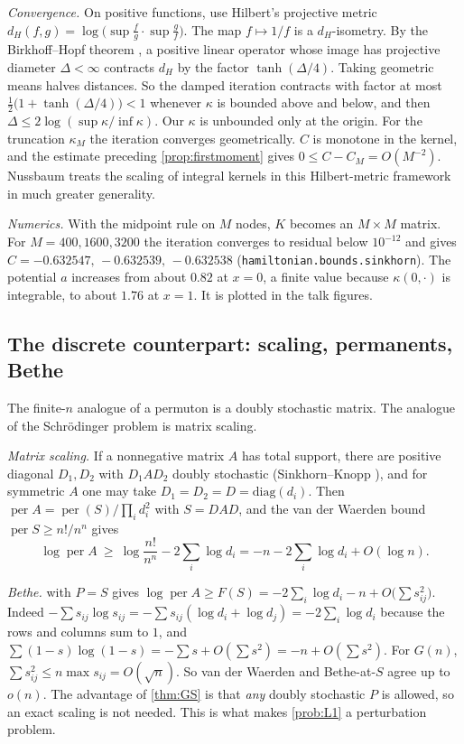 \emph{Convergence.} On positive functions, use Hilbert's projective metric
$d_H(f,g)=\log\bigl(\sup\frac fg\cdot\sup\frac gf\bigr)$. The map $f\mapsto1/f$ is a
$d_H$-isometry. By the Birkhoff--Hopf theorem \cite{Birkhoff}, a positive linear operator
whose image has projective diameter $\Delta<\infty$ contracts $d_H$ by the factor
$\tanh(\Delta/4)$. Taking geometric means halves distances. So the damped iteration
contracts with factor at most $\frac12\bigl(1+\tanh(\Delta/4)\bigr)<1$ whenever
$\kappa$ is bounded above and below, and then $\Delta\le2\log(\sup\kappa/\inf\kappa)$.
Our $\kappa$ is unbounded only at the origin. For the truncation $\kappa_M$ the iteration
converges geometrically. $C$ is monotone in the kernel, and the estimate preceding
\cref{prop:firstmoment} gives $0\le C-C_M=O(M^{-2})$. Nussbaum \cite{Nussbaum} treats
the scaling of integral kernels in this Hilbert-metric framework in much greater generality.

\emph{Numerics.} With the midpoint rule on $M$ nodes, $K$ becomes an $M\times M$ matrix.
For $M=400,1600,3200$ the iteration converges to residual below $10^{-12}$ and gives
$C=-0.632547,\,-0.632539,\,-0.632538$ (\texttt{hamiltonian.bounds.sinkhorn}). The potential
$a$ increases from about $0.82$ at $x=0$, a finite value because $\kappa(0,\cdot)$ is
integrable, to about $1.76$ at $x=1$. It is plotted in the talk figures.

\subsection{The discrete counterpart: scaling, permanents, Bethe}\label{app:bethe}
The finite-$n$ analogue of a permuton is a doubly stochastic matrix. The analogue of the
Schr\"odinger problem is matrix scaling.

\emph{Matrix scaling.} If a nonnegative matrix $A$ has total support, there are positive
diagonal $D_1,D_2$ with $D_1AD_2$ doubly stochastic (Sinkhorn--Knopp
\cite{SinkhornKnopp}), and for symmetric $A$ one may take $D_1=D_2=D=\mathrm{diag}(d_i)$.
Then $\operatorname{per}A=\operatorname{per}(S)/\prod_id_i^2$ with $S=DAD$, and the van der
Waerden bound $\operatorname{per}S\ge n!/n^n$ \cite{Egorychev,Falikman} gives
\[
\log\operatorname{per}A\ \ge\ \log\frac{n!}{n^n}-2\sum_i\log d_i=-n-2\sum_i\log d_i+O(\log n).
\]

\emph{Bethe.}  with $P=S$ gives
$\log\operatorname{per}A\ge F(S)=-2\sum_i\log d_i-n+O\bigl(\sum s_{ij}^2\bigr)$. Indeed
$-\sum s_{ij}\log s_{ij}=-\sum s_{ij}(\log d_i+\log d_j)=-2\sum_i\log d_i$ because the rows and
columns sum to $1$, and $\sum(1-s)\log(1-s)=-\sum s+O(\sum s^2)=-n+O(\sum s^2)$. For
$G(n)$, $\sum s_{ij}^2\le n\max s_{ij}=O(\sqrt n)$. So van der Waerden and Bethe-at-$S$
agree up to $o(n)$. The advantage of \cref{thm:GS} is that \emph{any} doubly stochastic $P$
is allowed, so an exact scaling is not needed. This is what makes \cref{prob:L1} a
perturbation problem.

